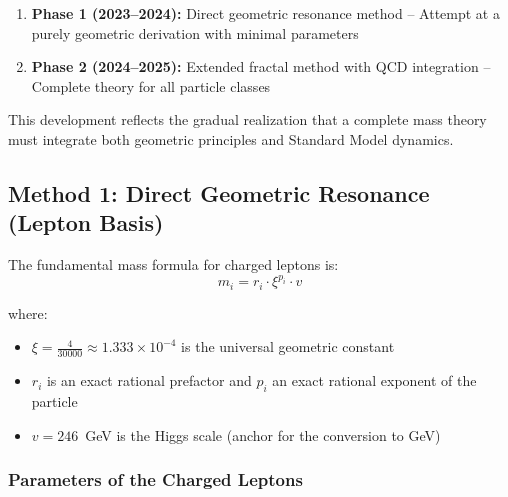 	\begin{enumerate}
		\item \textbf{Phase 1 (2023--2024):} Direct geometric resonance method -- Attempt at a purely geometric derivation with minimal parameters
		\item \textbf{Phase 2 (2024--2025):} Extended fractal method with QCD integration -- Complete theory for all particle classes
	\end{enumerate}
	
	This development reflects the gradual realization that a complete mass theory must integrate both geometric principles and Standard Model dynamics.
	
	\subsection{Method 1: Direct Geometric Resonance (Lepton Basis)}
	
	The fundamental mass formula for charged leptons is:
	\begin{equation}
		\boxed{m_i = r_i \cdot \xi^{p_i} \cdot v}
		\label{eq:t0_direct_mass}
	\end{equation}

	where:
	\begin{itemize}
		\item $\xi = \frac{4}{30000} \approx 1.333 \times 10^{-4}$ is the universal geometric constant
		\item $r_i$ is an exact rational prefactor and $p_i$ an exact rational exponent of the particle
		\item $v = 246$~GeV is the Higgs scale (anchor for the conversion to GeV)
	\end{itemize}

	\subsubsection{Parameters of the Charged Leptons}

	\begin{table}[h]
		\centering
		\caption{Parameters $r$, $p$ of the charged leptons (from \texttt{calc\_De.py})}
		\label{tab:lepton_qn_direkt}
	\end{table}

